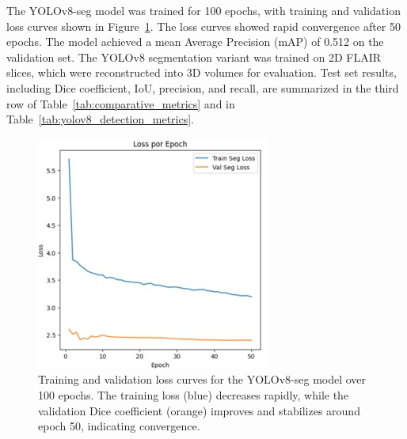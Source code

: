 \documentclass[12pt]{article}
\begin{document}
The YOLOv8-seg model was trained for 100 epochs, with training and validation loss curves shown in Figure~\ref{fig:yolov8_loss_curve}. The loss curves showed rapid convergence after 50 epochs. The model achieved a mean Average Precision (mAP) of 0.512 on the validation set. The YOLOv8 segmentation variant was trained on 2D FLAIR slices, which were reconstructed into 3D volumes for evaluation. Test set results, including Dice coefficient, IoU, precision, and recall, are summarized in the third row of Table~\ref{tab:comparative_metrics} and in Table~\ref{tab:yolov8_detection_metrics}.
%
\begin{figure}[tp]
    \centering
    \includegraphics[width=.7\textwidth]{figures/Figure 5.jpg}
    \caption{Training and validation loss curves for the YOLOv8-seg model over 100 epochs. The training loss (blue) decreases rapidly, while the validation Dice coefficient (orange) improves and stabilizes around epoch 50, indicating convergence.}\label{fig:yolov8_loss_curve}
\end{figure}
%
\end{document}
